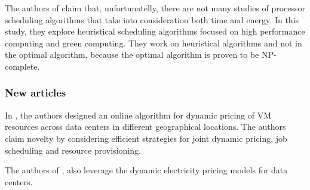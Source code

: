 The authors of \cite{EXE_METHOD} claim that, unfortunatelly, there are not many
studies of processor scheduling algorithms that take into consideration both
time and energy. In this study, they explore heuristical scheduling algorithms
focused on high performance computing and green computing. They work on
heuristical algorithms and not in the optimal algorithm, because the optimal
algorithm is proven to be NP-complete. 


\subsubsection{New articles}

In \cite{DYN_GEO}, the authors designed an online algorithm for dynamic pricing
of VM resources across data centers in different geographical locations. The
authors claim novelty by considering efficient strategies for joint dynamic
pricing, job scheduling and resource provisioning.

The authors of \cite{REDUCING_GEO}, \cite{DYN_POWER} also leverage the dynamic 
electricity pricing models for data centers.

